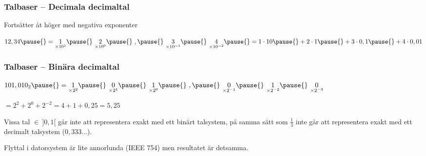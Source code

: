\documentclass{beamer}
\begin{document}
  \begin{frame}
    \frametitle{Talbaser -- Decimala decimaltal}

    \pause{}

    Fortsätter åt höger med negativa exponenter

    \pause{}

    \(12,34 \pause{} = \underset{\times 10^1}{1} \pause{}\ \underset{\times 10^0}{2} \pause{}\ , \pause{}\ \underset{\times 10^{-1}}{3} \pause{}\ \underset{\times 10^{-2}}{4} \pause{} = 1 \cdot 10 \pause{} + 2 \cdot 1 \pause{} + 3 \cdot 0,1 \pause{} + 4 \cdot 0,01\)

  \end{frame}

  \begin{frame}
    \frametitle{Talbaser -- Binära decimaltal}

    \pause{}

    \(101,010_2 \pause{} = \underset{\times 2^2}{1} \pause{}\ \underset{\times 2^1}{0} \pause{}\ \underset{\times 2^0}{1} \pause{}\ , \pause{}\ \underset{\times 2^{-1}}{0} \pause{}\ \underset{\times 2^{-2}}{1} \pause{}\ \underset{\times 2^{-3}}{0}\)

    \pause{}

    \vspace{-0.5em}

    \(= 2^2 + 2^0 + 2^{-2} = 4 + 1 + 0,25 = 5,25 \)

    \pause{}

    Vissa tal \(\in \ ]0, 1[\) går inte att representera exakt med ett binärt
    talsystem, på samma sätt som \(\frac{1}{3}\) inte går att representera exakt
    med ett decimalt talsystem (\(0,333\dots\)).

    \pause{}

    Flyttal i datorsystem är lite annorlunda (IEEE 754) men resultatet är
    detsamma.

  \end{frame}
\end{document}
